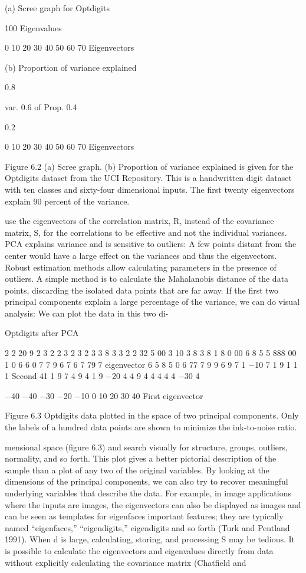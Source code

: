 (a) Scree graph for Optdigits

100 Eigenvalues

0 10 20 30 40 50 60 70 Eigenvectors

(b) Proportion of variance explained

0.8

var. 0.6 of Prop. 0.4

0.2

0 10 20 30 40 50 60 70 Eigenvectors

Figure 6.2 (a) Scree graph. (b) Proportion of variance explained is given for the Optdigits dataset from the UCI Repository. This is a handwritten digit dataset with ten classes and sixty-four dimensional inputs. The first twenty eigenvectors explain 90 percent of the variance.

use the eigenvectors of the correlation matrix, R, instead of the covariance matrix, S, for the correlations to be effective and not the individual variances. PCA explains variance and is sensitive to outliers: A few points distant from the center would have a large effect on the variances and thus the eigenvectors. Robust estimation methods allow calculating parameters in the presence of outliers. A simple method is to calculate the Mahalanobis distance of the data points, discarding the isolated data points that are far away. If the first two principal components explain a large percentage of the variance, we can do visual analysis: We can plot the data in this two di-

Optdigits after PCA

2 2 20 9 2 3 2 2 3 2 3 2 3 3 8 3 3 2 2 32 5 00 3 10 3 8 3 8 1 8 0 00 6 8 5 5 888 00 1 0 6 6 0 7 7 9 6 7 6 7 79 7 eigenvector 6 5 8 5 0 6 77 7 9 9 6 9 7 1 $-$10 7 1 9 1 1 1 Second 41 1 9 7 4 9 4 1 9 $-$20 4 4 9 4 4 4 4 4 $-$30 4

$-$40 $-$40 $-$30 $-$20 $-$10 0 10 20 30 40 First eigenvector

Figure 6.3 Optdigits data plotted in the space of two principal components. Only the labels of a hundred data points are shown to minimize the ink-to-noise ratio.

mensional space (figure 6.3) and search visually for structure, groups, outliers, normality, and so forth. This plot gives a better pictorial description of the sample than a plot of any two of the original variables. By looking at the dimensions of the principal components, we can also try to recover meaningful underlying variables that describe the data. For example, in image applications where the inputs are images, the eigenvectors can also be displayed as images and can be seen as templates for eigenfaces important features; they are typically named “eigenfaces,” “eigendigits,” eigendigits and so forth (Turk and Pentland 1991). When d is large, calculating, storing, and processing S may be tedious. It is possible to calculate the eigenvectors and eigenvalues directly from data without explicitly calculating the covariance matrix (Chatfield and

